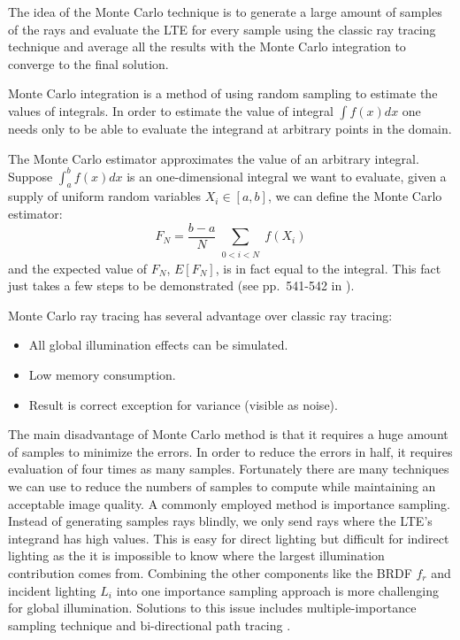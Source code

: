 
The idea of the Monte Carlo technique is to generate a large amount of samples of the rays and evaluate the LTE for every sample using the classic ray tracing technique and average all the results with the Monte Carlo integration to converge to the final solution.

Monte Carlo integration is a method of using random sampling to estimate the values of integrals. In order to estimate the value of integral \( \int f(x)dx \) one needs only to be able to evaluate the integrand at arbitrary points in the domain.

The Monte Carlo estimator approximates the value of an arbitrary integral. Suppose \( \int_{a}^{b}f(x)dx \) is an one-dimensional integral we want to evaluate, given a supply of uniform random variables \( X_{i} \in [a, b] \), we can define the Monte Carlo estimator:
\begin{equation}
F_{N} = \frac{b-a}{N}\sum_{\substack{0<i<N}}f(X_{i})
\end{equation}
and the expected value of \(F_{N}\), \(E[F_{N}]\), is in fact equal to the integral. This fact just takes a few steps to be demonstrated (see pp.~541-542 in \cite{Pharr:2010:PBR:1854996}).

Monte Carlo ray tracing has several advantage over classic ray tracing:
\begin{itemize}

\item All global illumination effects can be simulated.

\item Low memory consumption.

\item Result is correct exception for variance (visible as noise).

\end{itemize}

The main disadvantage of Monte Carlo method is that it requires a huge amount of samples to minimize the errors. In order to reduce the errors in half, it requires evaluation of four times as many samples. Fortunately there are many techniques we can use to reduce the numbers of samples to compute while maintaining an acceptable image quality. A commonly employed method is importance sampling. Instead of generating samples rays blindly, we only send rays where the LTE's integrand has high values. This is easy for direct lighting but difficult for indirect lighting as the it is impossible to know where the largest illumination contribution comes from. Combining the other components like the BRDF \(f_{r}\) and incident lighting \(L_{i}\) into one importance sampling approach is more challenging for global illumination. Solutions to this issue includes multiple-importance sampling technique and bi-directional path tracing \cite{Lafortune93bi-directionalpath}.


